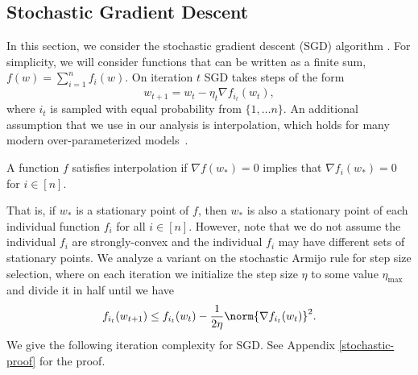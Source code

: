 \documentclass[10pt]{article} %
\begin{document}
\subsection{Stochastic Gradient Descent}
In this section, we consider the stochastic gradient descent (SGD) algorithm \cite{robbins1951stochastic}. For simplicity, we will consider functions that can be written as a finite sum, $f(w) = \sum_{i = 1}^n f_i(w)$. On iteration $t$ SGD takes steps of the form
\begin{equation}
    \label{stochastic-gradient-descent}
    w_{t+1} = w_{t} - \eta_{t} \nabla f_{i_t}(w_{t}),
\end{equation}
where $i_{t}$ is sampled with equal probability from $\{1, \dotsc n\}$. An additional assumption that we use in our analysis is interpolation, which holds for many modern over-parameterized models~\cite{zhang2016understanding,ma2018interpolation}.
\begin{definition}
    \label{interpolation}
    A function $f$ satisfies interpolation if $\nabla f(w_*) = 0$ implies that $\nabla f_i(w_*) = 0$ for $i \in [n]$.
\end{definition}
That is, if $w_*$ is a stationary point of $f$, then $w_*$ is also a stationary point of each individual function $f_i$ for all $i \in [n]$.
However, note that we do not assume the individual $f_i$ are strongly-convex and the individual $f_i$ may have different sets of stationary points. 
We analyze a variant on the stochastic Armijo rule \cite{sls} for step size selection, where on each iteration we initialize the step size $\eta$ to some value $\eta_\text{max}$ and divide it in half until we have
\begin{equation}
    \label{stochastic-line-search}
    f_{i_{t}}(w_{t+1})\leq f_{i_{t}}(w_{t}) - \frac{1}{2\eta} \norm{\nabla f_{i_{t}}(w_{t})}^2.
\end{equation}
We give the following iteration complexity for SGD. See Appendix \ref{stochastic-proof} for the proof.
\end{document}
